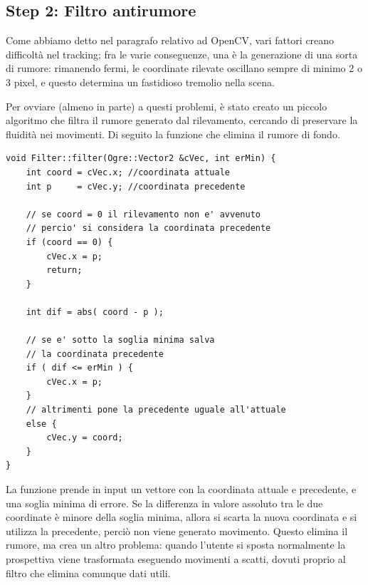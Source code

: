 \subsection*{Step 2: Filtro antirumore}
Come abbiamo detto nel paragrafo relativo ad OpenCV, vari fattori creano difficoltà nel tracking; fra le varie conseguenze, una è la generazione di una sorta di rumore: rimanendo fermi, le coordinate rilevate oscillano sempre di minimo 2 o 3 pixel, e questo determina un fastidioso tremolio nella scena.

Per ovviare (almeno in parte) a questi problemi, è stato creato un piccolo algoritmo che filtra il rumore generato dal rilevamento, cercando di preservare la fluidità nei movimenti. Di seguito la funzione che elimina il rumore di fondo.
\begin{lstlisting}
void Filter::filter(Ogre::Vector2 &cVec, int erMin) {
    int coord = cVec.x; //coordinata attuale
    int p     = cVec.y; //coordinata precedente
	
    // se coord = 0 il rilevamento non e' avvenuto
    // percio' si considera la coordinata precedente
    if (coord == 0) {
        cVec.x = p;
        return;
    }
    
    int dif = abs( coord - p );
    
    // se e' sotto la soglia minima salva 
    // la coordinata precedente
    if ( dif <= erMin ) {
        cVec.x = p;     	
    }
    // altrimenti pone la precedente uguale all'attuale
    else {
        cVec.y = coord;	
    }  
}
\end{lstlisting} 

La funzione prende in input un vettore con la coordinata attuale e precedente, e una soglia minima di errore.
Se la differenza in valore assoluto tra le due coordinate è minore della soglia minima, allora si scarta la nuova coordinata e si utilizza la precedente, perciò non viene generato movimento. Questo elimina il rumore, ma crea un altro problema: quando l'utente si sposta normalmente la prospettiva viene trasformata eseguendo movimenti a scatti, dovuti proprio al filtro che elimina comunque dati utili.

